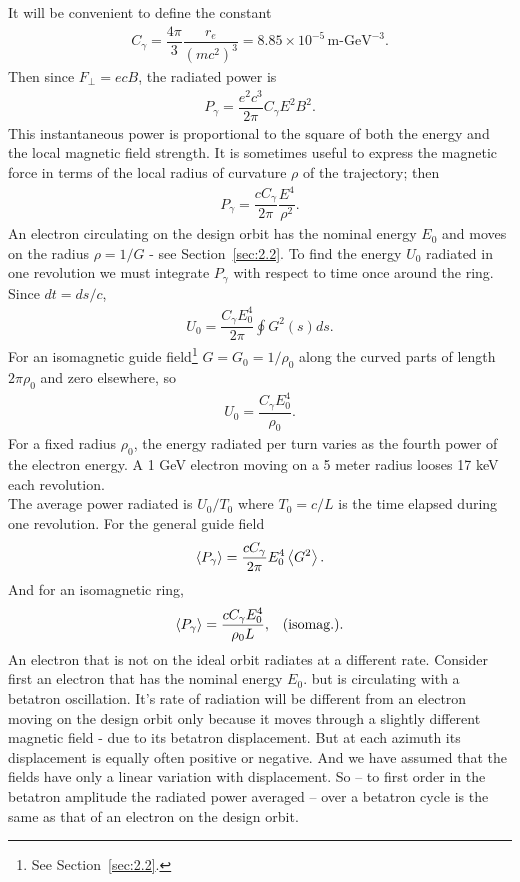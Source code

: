 It will be convenient to define the constant
\begin{align} \label{eq:4.2}
	C_\gamma = \dfrac{4 \pi}{3} \dfrac{r_e}{(m c^2)^3} = 8.85 \times 10^{-5}\, \text{m-GeV}^{-3}.
\end{align}
Then since $F_\perp = ecB$, the radiated power is
\begin{align} \label{eq:4.3}
	P_\gamma = \dfrac{e^2 c^3}{2 \pi} C_\gamma E^2 B^2.
\end{align}
This instantaneous power is proportional to the square of both the energy and the local magnetic field strength. It is sometimes useful to express the magnetic force in terms of the local radius of curvature $\rho$ of the trajectory; then
\begin{align} \label{eq:4.4}
	P_\gamma = \dfrac{c C_\gamma}{2 \pi}\dfrac{E^4}{\rho^2}.
\end{align}
An electron circulating on the design orbit has the nominal energy $E_0$ and moves on the radius $\rho = 1/G$ - see Section~\ref{sec:2.2}. To find the energy $U_0$ radiated in one revolution
 we must integrate $P_\gamma$ with respect to time once around the ring. Since $dt = ds/c$,
\begin{align}
	U_0 = \dfrac{C_\gamma E_0^4}{2 \pi} \oint G^2(s) ds.
\end{align}
For an isomagnetic guide field\footnote{See Section~\ref{sec:2.2}.} $G = G_0 = 1/\rho_0$ along the curved parts of length $2 \pi \rho_0$ and zero elsewhere, so
\begin{align} \label{eq:4.8}
	U_0 = \dfrac{C_\gamma E_0^4}{\rho_0}.
\end{align}
For a fixed radius $\rho_0$, the energy radiated per turn varies as the fourth power of the electron energy. A 1 GeV electron moving on a 5 meter radius looses 17 keV each revolution.\\
The average power radiated is $U_0/T_0$ where $T_0= c/L$ is the time elapsed during one revolution. For the general guide field
\begin{align} \label{eq:4.9}
	\left< P_\gamma \right> = \dfrac{cC_\gamma}{2\pi} E_0^4 \left< G^2 \right>.
\end{align}
And for an isomagnetic ring,
\begin{align} \label{eq:4.10}
	\left< P_\gamma \right> = \dfrac{c C_\gamma E_0^4}{\rho_0 L}, && \text{(isomag.).}
\end{align}
An electron that is not on the ideal orbit radiates at a different rate. Consider first an electron that has the nominal energy $E_0$. but is circulating with a betatron oscillation. It's rate of radiation will be different from an electron moving on the design orbit only because it moves through a slightly different magnetic field - due to its betatron displacement. But at each azimuth its displacement is equally often positive or negative. And we have assumed that the fields have only a linear variation with displacement. So -- to first order in the betatron amplitude the radiated power averaged -- over a betatron cycle is the same as that of an electron on the design orbit.\\
